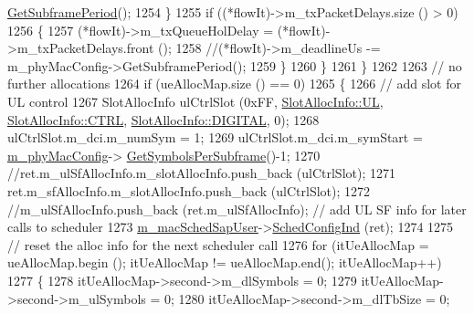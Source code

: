 \begin{DoxyCode}
      \hyperlink{classns3_1_1MmWavePhyMacCommon_a1d402260d29c8931dd3dde73b295e23d}{GetSubframePeriod}();
1254                         \}
1255                         \textcolor{keywordflow}{if} ((*flowIt)->m\_txPacketDelays.size () > 0)
1256                         \{
1257                                 (*flowIt)->m\_txQueueHolDelay = (*flowIt)->m\_txPacketDelays.front ();
1258                                 \textcolor{comment}{//(*flowIt)->m\_deadlineUs -= m\_phyMacConfig->GetSubframePeriod();}
1259                         \}
1260                 \}
1261         \}
1262 
1263         \textcolor{comment}{// no further allocations}
1264         \textcolor{keywordflow}{if} (ueAllocMap.size () == 0)
1265         \{
1266                 \textcolor{comment}{// add slot for UL control}
1267                 SlotAllocInfo ulCtrlSlot (0xFF, \hyperlink{structns3_1_1SlotAllocInfo_a6cad60db1d39034f1851e2cea625fe5da916b5be54594ead6ed677c570311cad2}{SlotAllocInfo::UL}, 
      \hyperlink{structns3_1_1SlotAllocInfo_a3ea7cb503bfd0c9a4df55a71b81b9331ad78b7d76ef82d56c33be1fa9c1867409}{SlotAllocInfo::CTRL}, \hyperlink{structns3_1_1SlotAllocInfo_adcbd067d82be6260b3399167d8f0b4eca47a67c342db658a08ded9ce4b49417ea}{SlotAllocInfo::DIGITAL}, 0);
1268                 ulCtrlSlot.m\_dci.m\_numSym = 1;
1269                 ulCtrlSlot.m\_dci.m\_symStart = \hyperlink{classns3_1_1MmWaveMacScheduler_a24d7af4971d2e500fe543cefbafa2fd9}{m\_phyMacConfig}->
      \hyperlink{classns3_1_1MmWavePhyMacCommon_a2fe835b76e3c689defa413e395cd10cb}{GetSymbolsPerSubframe}()-1;
1270                 \textcolor{comment}{//ret.m\_ulSfAllocInfo.m\_slotAllocInfo.push\_back (ulCtrlSlot);}
1271                 ret.m\_sfAllocInfo.m\_slotAllocInfo.push\_back (ulCtrlSlot);
1272                 \textcolor{comment}{//m\_ulSfAllocInfo.push\_back (ret.m\_ulSfAllocInfo); // add UL SF info for later calls to
       scheduler}
1273                 \hyperlink{classns3_1_1MmWaveFlexTtiMaxWeightMacScheduler_a4e443a317d7f5a4b2399043552cca5d5}{m\_macSchedSapUser}->\hyperlink{classns3_1_1MmWaveMacSchedSapUser_ac164dd52215c3924cf421b56089eece4}{SchedConfigInd} (ret);
1274 
1275                 \textcolor{comment}{// reset the alloc info for the next scheduler call}
1276                 \textcolor{keywordflow}{for} (itUeAllocMap = ueAllocMap.begin (); itUeAllocMap != ueAllocMap.end(); itUeAllocMap++)
1277                 \{
1278                         itUeAllocMap->second->m\_dlSymbols = 0;
1279                         itUeAllocMap->second->m\_ulSymbols = 0;
1280                         itUeAllocMap->second->m\_dlTbSize = 0;

\end{DoxyCode}
